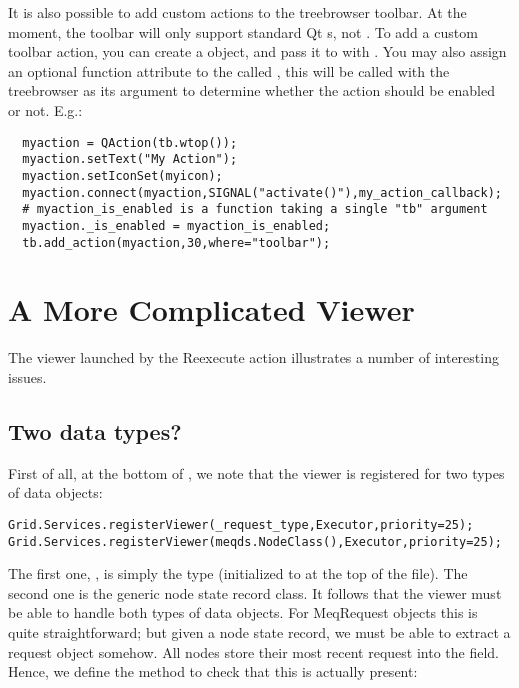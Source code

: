 \documentclass[12pt,twoside]{book}
\begin{document}
  It is also possible to add custom actions to the treebrowser toolbar. At the
  moment, the toolbar will only support standard Qt s, not
  . To add a custom toolbar action, you can create a
   object, and pass it to  with
  . You may also assign an optional function attribute to
  the  called , this will be called with the
  treebrowser as its argument to determine whether the action should be enabled
  or not. E.g.:
  
\begin{verbatim}  
  myaction = QAction(tb.wtop());
  myaction.setText("My Action");
  myaction.setIconSet(myicon);
  myaction.connect(myaction,SIGNAL("activate()"),my_action_callback);
  # myaction_is_enabled is a function taking a single "tb" argument
  myaction._is_enabled = myaction_is_enabled; 
  tb.add_action(myaction,30,where="toolbar");
\end{verbatim}  
  

\section{A More Complicated Viewer}

  The  viewer launched by the Reexecute action illustrates a number
  of interesting issues.
  
\subsection{Two data types?}
  
  First of all, at the bottom of , we note that the viewer
  is registered for two types of data objects:
  
\begin{verbatim}  
Grid.Services.registerViewer(_request_type,Executor,priority=25);
Grid.Services.registerViewer(meqds.NodeClass(),Executor,priority=25);
\end{verbatim}  

  The first one, , is simply the  type
  (initialized to  at the top of the file).
  The second one is the generic node state record class. It follows that the
  viewer must be able to handle both types of data objects. For MeqRequest
  objects this is quite straightforward; but given a node state record,  we must
  be able to extract a request object somehow. All nodes store their most recent
  request into the  field. Hence, we define the 
  method to check that this is actually present:
\end{document}
